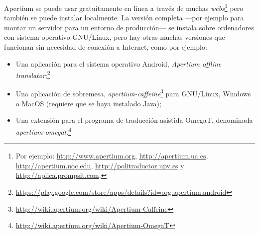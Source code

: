 Apertium se puede usar gratuitamente en linea a través de muchas \emph{webs}\footnote{Por ejemplo: \url{http://www.apertium.org}, \url{http://apertium.ua.es}, \url{http://apertium.uoc.edu}, \url{http://politraductor.upv.es} y \url{http://aplica.prompsit.com}.}  pero también se puede instalar localmente. La versión completa ---por ejemplo para montar un servidor para un entorno de producción--- se instala sobre ordenadores con sistema operativo GNU/Linux, pero hay otras muchas versiones que funcionan sin necesidad de conexión a Internet, como por ejemplo: \begin{itemize} \item Una aplicación para el sistema operativo Android, \emph{Apertium offline translator};\footnote{\url{https://play.google.com/store/apps/details?id=org.apertium.android}} \item Una aplicación de sobremesa, \emph{apertium-caffeine}\footnote{\url{http://wiki.apertium.org/wiki/Apertium-Caffeine}} para GNU/Linux, Windows o MacOS (requiere que se haya instalado Java); \item Una extensión para el programa de traducción asistida OmegaT, denominada \emph{apertium-omegat}.\footnote{\url{http://wiki.apertium.org/wiki/Apertium-OmegaT}} \end{itemize} 

